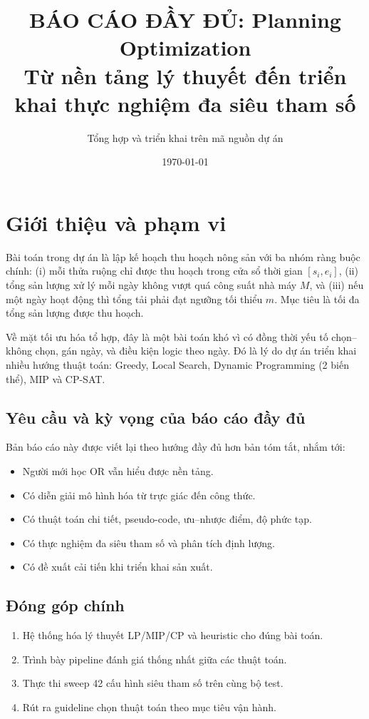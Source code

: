 \documentclass[12pt,a4paper]{article}
\title{BÁO CÁO ĐẦY ĐỦ: Planning Optimization\\
\large Từ nền tảng lý thuyết đến triển khai thực nghiệm đa siêu tham số}
\author{Tổng hợp và triển khai trên mã nguồn dự án}
\date{\today}
\begin{document}
\maketitle
\tableofcontents
\newpage

\section{Giới thiệu và phạm vi}
Bài toán trong dự án là lập kế hoạch thu hoạch nông sản với ba nhóm ràng buộc chính: (i) mỗi thửa ruộng chỉ được thu hoạch trong cửa sổ thời gian $[s_i,e_i]$, (ii) tổng sản lượng xử lý mỗi ngày không vượt quá công suất nhà máy $M$, và (iii) nếu một ngày hoạt động thì tổng tải phải đạt ngưỡng tối thiểu $m$. Mục tiêu là tối đa tổng sản lượng được thu hoạch.

Về mặt tối ưu hóa tổ hợp, đây là một bài toán khó vì có đồng thời yếu tố chọn--không chọn, gán ngày, và điều kiện logic theo ngày. Đó là lý do dự án triển khai nhiều hướng thuật toán: Greedy, Local Search, Dynamic Programming (2 biến thể), MIP và CP-SAT.

\subsection{Yêu cầu và kỳ vọng của báo cáo đầy đủ}
Bản báo cáo này được viết lại theo hướng đầy đủ hơn bản tóm tắt, nhắm tới:
\begin{itemize}[leftmargin=1.4cm]
  \item Người mới học OR vẫn hiểu được nền tảng.
  \item Có diễn giải mô hình hóa từ trực giác đến công thức.
  \item Có thuật toán chi tiết, pseudo-code, ưu--nhược điểm, độ phức tạp.
  \item Có thực nghiệm đa siêu tham số và phân tích định lượng.
  \item Có đề xuất cải tiến khi triển khai sản xuất.
\end{itemize}

\subsection{Đóng góp chính}
\begin{enumerate}
  \item Hệ thống hóa lý thuyết LP/MIP/CP và heuristic cho đúng bài toán.
  \item Trình bày pipeline đánh giá thống nhất giữa các thuật toán.
  \item Thực thi sweep 42 cấu hình siêu tham số trên cùng bộ test.
  \item Rút ra guideline chọn thuật toán theo mục tiêu vận hành.
\end{enumerate}
\end{document}
